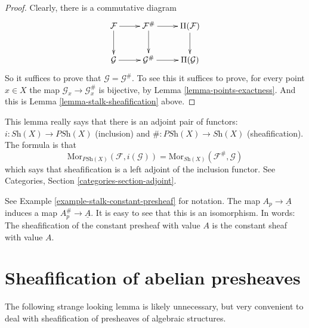 \begin{proof}
Clearly, there is a commutative diagram
$$
\xymatrix{
\mathcal{F} \ar[r] \ar[d] &
\mathcal{F}^\# \ar[r] \ar[d] &
\Pi(\mathcal{F}) \ar[d] \\
\mathcal{G} \ar[r] &
\mathcal{G}^\# \ar[r] &
\Pi(\mathcal{G}) \\
}
$$
So it suffices to prove that $\mathcal{G} = \mathcal{G}^\#$.
To see this it suffices to prove, for every point $x \in X$ the
map $\mathcal{G}_x \to \mathcal{G}^\#_x$ is bijective, by
Lemma \ref{lemma-points-exactness}. And this is Lemma
\ref{lemma-stalk-sheafification} above.
\end{proof}

\noindent
This lemma really says that there is an adjoint pair
of functors: $i : \textit{Sh}(X) \to \textit{PSh}(X)$
(inclusion) and $\# : \textit{PSh}(X) \to \textit{Sh}(X)$
(sheafification). The formula is that
$$
\text{Mor}_{\textit{PSh}(X)}(\mathcal{F}, i(\mathcal{G}))
=
\text{Mor}_{\textit{Sh}(X)}(\mathcal{F}^\#, \mathcal{G})
$$
which says that sheafification is a left adjoint of
the inclusion functor. See Categories, Section
\ref{categories-section-adjoint}.

\begin{example}
\label{example-sheafify-constant}
See Example \ref{example-stalk-constant-presheaf} for notation.
The map $A_p \to \underline{A}$ induces a map
$A_p^\# \to \underline{A}$. It is easy to see that this
is an isomorphism. In words: The sheafification
of the constant presheaf with value $A$ is the
constant sheaf with value $A$.
\end{example}



\section{Sheafification of abelian presheaves}
\label{section-sheafify-abelian-presheaves}

\noindent
The following strange looking lemma is likely unnecessary, but
very convenient to deal with sheafification of presheaves
of algebraic structures.

